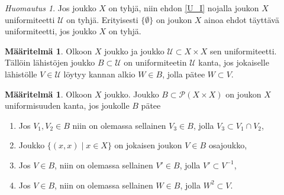 \documentclass[12pt,a4paper,leqno]{report}
\newcommand{\U}{\mathcal{U}}
\newcommand{\Pot}{\mathcal{P}}
\theoremstyle{plain}
\theoremstyle{definition}
\newtheorem{maar}[equation]{Määritelmä}
\theoremstyle{remark}
\newtheorem{huom}[equation]{Huomautus}
\begin{document}
\begin{huom}
Jos joukko $X$ on tyhjä, niin ehdon \ref{U_I} 
nojalla joukon $X$ uniformiteetti $\U$ on tyhjä. Erityisesti $\{\emptyset\}$ on joukon $X$ ainoa ehdot täyttävä uniformiteetti, jos joukko $X$ on tyhjä.
\end{huom}
\begin{maar}
Olkoon $X$ joukko ja joukko $\U\subset X\times X$ sen uniformiteetti. Tällöin lähistöjen joukko $B\subset \U$ on uniformiteetin $\U$ kanta, jos jokaiselle lähistölle $V\in\U$ löytyy kannan alkio $W\in B$, jolla pätee $W\subset V$.
\end{maar}
\begin{maar}\label{uniformin kannan maar}
Olkoon $X$ joukko. Joukko $B\subset \Pot (X\times X)$ on joukon $X$ uniformisuuden kanta, jos joukolle $B$ pätee
\begin{enumerate} [label=(B\arabic*)]
\item\label{B_I} Jos $V_1,V_2\in B$ niin on olemassa sellainen $V_3\in B$, jolla $V_3\subset V_1\cap V_2$,
\item\label{U'_I} Joukko $\{(x,x)\mid x\in X\}$ on jokaisen joukon $V\in B$ osajoukko,
\item\label{U'_II} Jos $V\in B$, niin on olemassa sellainen $V'\in B$, jolla $V'\subset V^{-1}%
$,
\item\label{U'_III} Jos $V\in B$, niin on olemassa sellainen $W\in B$, jolla $ W^2\subset V$.%
\end{enumerate}
\end{maar}
\end{document}
